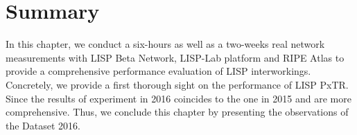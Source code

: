 \section{Summary}
\label{sec:pxtr_conclusion}
In this chapter, we conduct a six-hours as well as a two-weeks real network measurements with LISP Beta Network, LISP-Lab platform and RIPE Atlas to provide a comprehensive performance evaluation of LISP interworkings. Concretely, we provide a first thorough sight on the performance of LISP PxTR. Since the results of experiment in 2016 coincides to the one in 2015 and are more comprehensive. Thus, we conclude this chapter by presenting the observations of the Dataset 2016. 

